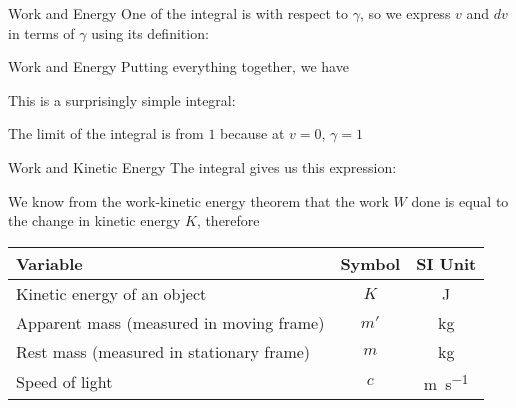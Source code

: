 \documentclass[12pt,compress,aspectratio=169]{beamer}
\begin{document}
\begin{frame}{Work and Energy}
  One of the integral is with respect to $\gamma$, so we express $v$ and $dv$
  in terms of $\gamma$ using its definition:

\end{frame}



\begin{frame}{Work and Energy}
  Putting everything together, we have


  This is a surprisingly simple integral:


  The limit of the integral is from $1$ because at $v=0$, $\gamma=1$
\end{frame}



\begin{frame}{Work and Kinetic Energy}
  The integral gives us this expression:
  

  \vspace{-.15in}We know from the work-kinetic energy theorem that the work $W$
  done is equal to the change in kinetic energy $K$, therefore
  

  \vspace{-.1in}
  \begin{center}
    \begin{tabular}{l|c|c}
      \rowcolor{pink}
      \textbf{Variable} & \textbf{Symbol} & \textbf{SI Unit}\\ \hline
      Kinetic energy of an object & $K$  & \si{\joule}\\
      Apparent mass (measured in moving frame) & $m'$ & \si{\kilo\gram}\\
      Rest mass (measured in stationary frame) & $m$  & \si{\kilo\gram}\\
      Speed of light              & $c$ & \si{\metre\per\second}
    \end{tabular}
  \end{center}
\end{frame}
\end{document}
